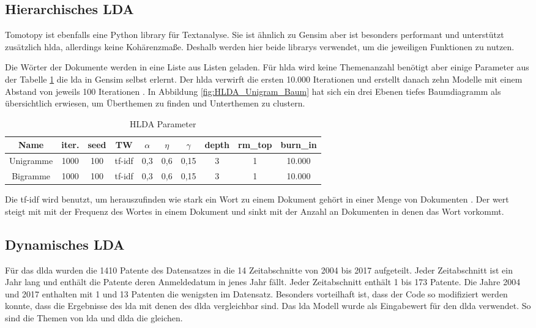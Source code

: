 \subsection{Hierarchisches LDA}

Tomotopy ist ebenfalls eine Python library für Textanalyse. Sie ist ähnlich zu Gensim aber ist besonders performant und unterstützt zusätzlich \gls{hlda}, allerdings keine Kohärenzmaße. Deshalb werden hier beide librarys verwendet, um die jeweiligen Funktionen zu nutzen.

Die Wörter der Dokumente werden in eine Liste aus Listen geladen. Für \gls{hlda} wird keine Themenanzahl benötigt aber einige Parameter aus der Tabelle \ref{table:HLDA_Parameter} die \gls{lda} in Gensim selbst erlernt. Der \gls{hlda} verwirft die ersten 10.000 Iterationen und erstellt danach zehn Modelle mit einem Abstand von jeweils 100 Iterationen \parencite[vgl.][S. 6]{griffiths2004hierarchical}. In Abbildung \ref{fig:HLDA_Unigram_Baum} hat sich ein drei Ebenen tiefes Baumdiagramm als übersichtlich erwiesen, um Überthemen zu finden und Unterthemen zu clustern.

\begin{table}[H]
	\RawFloats
	\centering
	\caption{HLDA Parameter}
	\begin{tabular}{|c|c|c|c|c|c|c|c|c|c|}
		\hline 
		Name& iter. & seed & TW & $\alpha$ & $\eta$ & $\gamma$ & depth & rm\_top & burn\_in \\ 
		\hline 
		Unigramme& 1000 & 100 & tf-idf & 0,3 & 0,6 & 0,15 & 3 & 1 & 10.000 \\ 
		\hline 
		Bigramme& 1000 & 100 & tf-idf & 0,3 & 0,6 & 0,15 & 3 & 1 & 10.000  \\ 
		\hline  
	\end{tabular}
	\label{table:HLDA_Parameter}
\end{table} 

Die \gls{tf-idf} wird benutzt, um herauszufinden wie stark ein Wort zu einem Dokument gehört in einer Menge von Dokumenten \parencite[vgl.][]{luhn1957statistical}  \parencite[vgl.][]{jones1972statistical}. Der wert steigt mit mit der Frequenz des Wortes in einem Dokument und sinkt mit der Anzahl an Dokumenten in denen das Wort vorkommt.

\subsection{Dynamisches LDA}

Für das \gls{dlda} wurden die 1410 Patente des Datensatzes in die 14 Zeitabschnitte von 2004 bis 2017 aufgeteilt. Jeder Zeitabschnitt ist ein Jahr lang und enthält die Patente deren Anmeldedatum in jenes Jahr fällt. Jeder Zeitabschnitt enthält 1 bis 173 Patente. Die Jahre 2004 und 2017 enthalten mit 1 und 13 Patenten die wenigsten im Datensatz. Besonders vorteilhaft ist, dass der Code so modifiziert werden konnte, dass die Ergebnisse des \gls{lda} mit denen des \gls{dlda} vergleichbar sind. Das \gls{lda} Modell wurde als Eingabewert für den \gls{dlda} verwendet. So sind die Themen von \gls{lda} und \gls{dlda} die gleichen.


